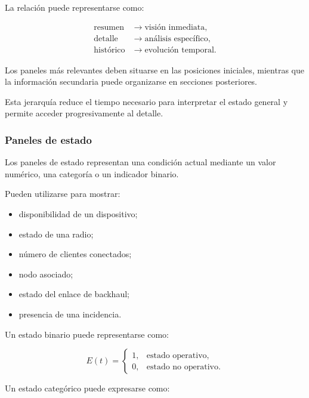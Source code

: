 La relación puede representarse como:

\[
\begin{aligned}
    \text{resumen}
    &\longrightarrow
    \text{visión inmediata},\\
    \text{detalle}
    &\longrightarrow
    \text{análisis específico},\\
    \text{histórico}
    &\longrightarrow
    \text{evolución temporal}.
\end{aligned}
\]

Los paneles más relevantes deben situarse en las posiciones iniciales,
mientras que la información secundaria puede organizarse en secciones
posteriores.

Esta jerarquía reduce el tiempo necesario para interpretar el estado
general y permite acceder progresivamente al detalle.


\subsubsection*{Paneles de estado}

Los paneles de estado representan una condición actual mediante un valor
numérico, una categoría o un indicador binario.

Pueden utilizarse para mostrar:

\begin{itemize}
    \item disponibilidad de un dispositivo;

    \item estado de una radio;

    \item número de clientes conectados;

    \item nodo asociado;

    \item estado del enlace de backhaul;

    \item presencia de una incidencia.
\end{itemize}

Un estado binario puede representarse como:

\[
    E(t)
    =
    \begin{cases}
        1, & \text{estado operativo},\\
        0, & \text{estado no operativo}.
    \end{cases}
\]

Un estado categórico puede expresarse como:

